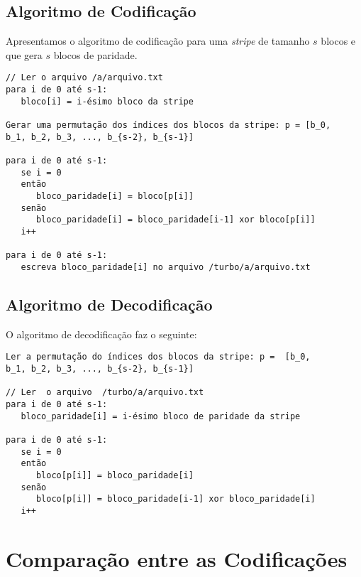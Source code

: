 \subsection{Algoritmo de Codificação}

Apresentamos o algoritmo de codificação para uma \emph{stripe} de tamanho $s$ blocos e que gera $s$ blocos de paridade.

\begin{verbatim}
// Ler o arquivo /a/arquivo.txt
para i de 0 até s-1:
   bloco[i] = i-ésimo bloco da stripe

Gerar uma permutação dos índices dos blocos da stripe: p = [b_0,
b_1, b_2, b_3, ..., b_{s-2}, b_{s-1}]

para i de 0 até s-1:
   se i = 0
   então
      bloco_paridade[i] = bloco[p[i]]
   senão
      bloco_paridade[i] = bloco_paridade[i-1] xor bloco[p[i]]
   i++

para i de 0 até s-1:
   escreva bloco_paridade[i] no arquivo /turbo/a/arquivo.txt
\end{verbatim}

\subsection{Algoritmo de Decodificação}

O algoritmo de decodificação faz o seguinte:

\begin{verbatim}
Ler a permutação do índices dos blocos da stripe: p =  [b_0,
b_1, b_2, b_3, ..., b_{s-2}, b_{s-1}]

// Ler  o arquivo  /turbo/a/arquivo.txt
para i de 0 até s-1:
   bloco_paridade[i] = i-ésimo bloco de paridade da stripe

para i de 0 até s-1:
   se i = 0
   então
      bloco[p[i]] = bloco_paridade[i]
   senão
      bloco[p[i]] = bloco_paridade[i-1] xor bloco_paridade[i]
   i++
\end{verbatim}

\section{Comparação entre as Codificações}



